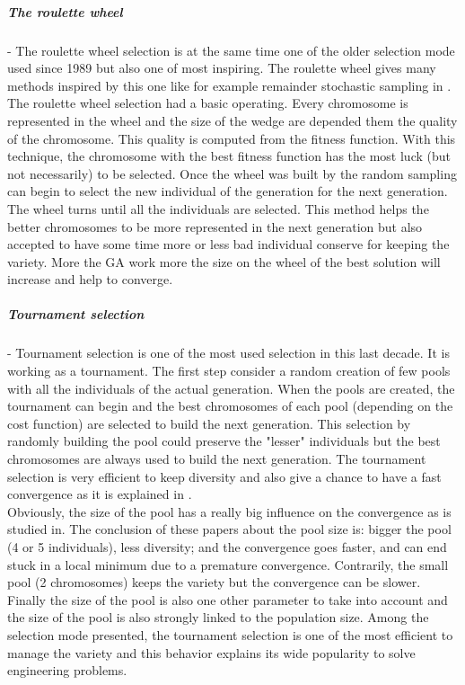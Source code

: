 \subparagraph{The roulette wheel}
-	The roulette wheel selection is at the same time one of the older selection mode used since 1989 but also one of most inspiring.  The roulette wheel  gives many methods inspired by this one like for example remainder stochastic sampling in  \cite{138*whitley1994}. The roulette wheel selection had a basic operating. Every chromosome is represented in the wheel and the size of the wedge are depended them the quality of the chromosome. This quality is computed from the fitness function.  With this technique, the chromosome with the best fitness function has the most luck (but not necessarily) to be selected. 
Once the wheel was built by the random sampling can begin to select the new individual of the generation for the next generation.  The wheel turns until all the individuals are selected.  
This method helps the better chromosomes to be more represented in the next generation but also accepted to have some time more or less bad individual conserve for keeping the variety. More the GA work more the size on the wheel of the best solution will increase and help to converge. \\

\subparagraph{Tournament selection}
-	Tournament selection is one of the most used selection in this last decade. It is working as a tournament. 
The first step consider a random creation of few pools with all the individuals of the actual generation.
 When the pools are created, the tournament can begin and the best chromosomes of each pool (depending on the cost function) are selected to build the next generation. 
 This selection by randomly building the pool could preserve the "lesser" individuals but the best chromosomes are always used to build the next generation. The tournament selection is very efficient to keep diversity and also give a chance to have a fast convergence as it is explained in \cite{64*matsui1999}. \\ 
 Obviously, the size of the pool has a really big influence on the convergence as is studied in\cite{64*matsui1999,95*miller1995}. The conclusion of these papers about the pool size  is: bigger  the pool (4 or 5 individuals), less diversity; and the convergence goes faster, and can end stuck in a local minimum due to a premature convergence.
  Contrarily, the small pool (2 chromosomes) keeps the variety but the convergence can be slower. 
  Finally the size of the pool is also one other parameter to take into account and the size of the pool is also strongly linked to the population size.
Among the selection mode presented, the tournament selection is one of the most efficient  to manage the  variety and this behavior explains its  wide popularity to solve engineering problems. \\ 

